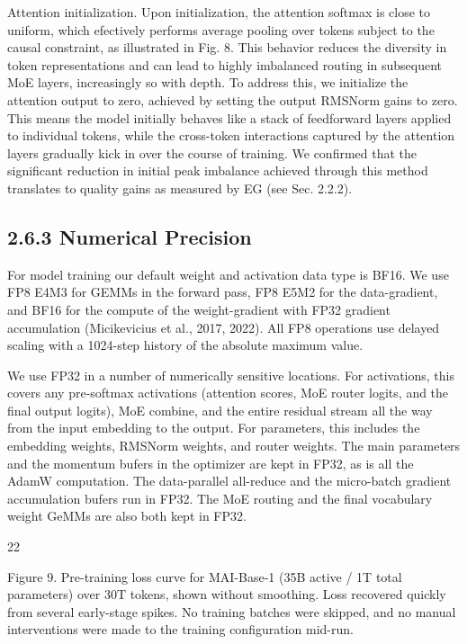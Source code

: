\documentclass[
  10
]{article}
\begin{document}
Attention initialization. Upon initialization, the attention softmax is
close to uniform, which efectively performs average pooling over tokens
subject to the causal constraint, as illustrated in Fig. 8. This
behavior reduces the diversity in token representations and can lead to
highly imbalanced routing in subsequent MoE layers, increasingly so with
depth. To address this, we initialize the attention output to zero,
achieved by setting the output RMSNorm gains to zero. This means the
model initially behaves like a stack of feedforward layers applied to
individual tokens, while the cross-token interactions captured by the
attention layers gradually kick in over the course of training. We
confirmed that the significant reduction in initial peak imbalance
achieved through this method translates to quality gains as measured by
EG (see Sec. 2.2.2).

\subsection{2.6.3 Numerical Precision}\label{numerical-precision}

For model training our default weight and activation data type is BF16.
We use FP8 E4M3 for GEMMs in the forward pass, FP8 E5M2 for the
data-gradient, and BF16 for the compute of the weight-gradient with FP32
gradient accumulation (Micikevicius et al., 2017, 2022). All FP8
operations use delayed scaling with a 1024-step history of the absolute
maximum value.

We use FP32 in a number of numerically sensitive locations. For
activations, this covers any pre-softmax activations (attention scores,
MoE router logits, and the final output logits), MoE combine, and the
entire residual stream all the way from the input embedding to the
output. For parameters, this includes the embedding weights, RMSNorm
weights, and router weights. The main parameters and the momentum bufers
in the optimizer are kept in FP32, as is all the AdamW computation. The
data-parallel all-reduce and the micro-batch gradient accumulation
bufers run in FP32. The MoE routing and the final vocabulary weight
GeMMs are also both kept in FP32.

22

Figure 9. Pre-training loss curve for MAI-Base-1 (35B active / 1T total
parameters) over 30T tokens, shown without smoothing. Loss recovered
quickly from several early-stage spikes. No training batches were
skipped, and no manual interventions were made to the training
configuration mid-run.
\end{document}
